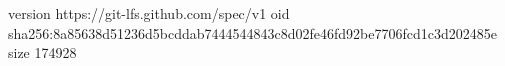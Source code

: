 version https://git-lfs.github.com/spec/v1
oid sha256:8a85638d51236d5bcddab7444544843c8d02fe46fd92be7706fcd1c3d202485e
size 174928
